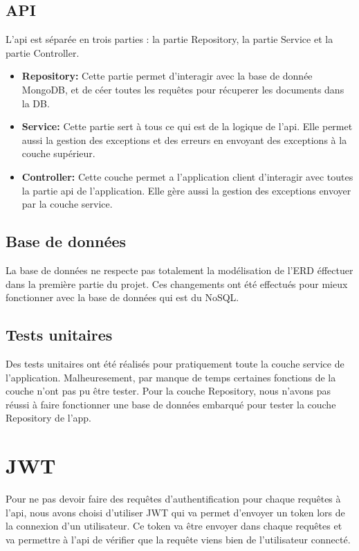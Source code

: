 \documentclass[../rapport.tex]{subfiles}
\begin{document}
\subsection{API}

L'api est séparée en trois parties : la partie Repository, la partie Service et la partie Controller.

\begin{itemize}
    \item \textbf{Repository:} Cette partie permet d'interagir avec la base de donnée MongoDB, et de céer toutes les requêtes pour récuperer les documents dans la DB.
    \item \textbf{Service:} Cette partie sert à tous ce qui est de la logique de l'api. Elle permet aussi la gestion des exceptions et des erreurs en envoyant des exceptions à la couche supérieur.
    \item \textbf{Controller:} Cette couche permet a l'application client d'interagir avec toutes la partie api de l'application. Elle gère aussi la gestion des exceptions envoyer par la couche service. 
\end{itemize}

\subsection{Base de données}

La base de données ne respecte pas totalement la modélisation de l'ERD éffectuer dans la première partie du projet.
Ces changements ont été effectués pour mieux fonctionner avec la base de données qui est du NoSQL.

\subsection{Tests unitaires}

Des tests unitaires ont été réalisés pour pratiquement toute la couche service de l'application. Malheuresement, par manque de temps certaines fonctions de la couche n'ont pas pu être tester. Pour la couche Repository, nous n'avons pas réussi à faire fonctionner une base de données embarqué pour tester la couche Repository de l'app.

\section{JWT}
 
Pour ne pas devoir faire des requêtes d'authentification pour chaque requêtes à l'api, nous avons choisi d'utiliser JWT qui va permet d'envoyer un token lors de la connexion d'un utilisateur. Ce token va être envoyer dans chaque requêtes et va permettre à l'api de vérifier que la requête viens bien de l'utilisateur connecté.
\end{document}

